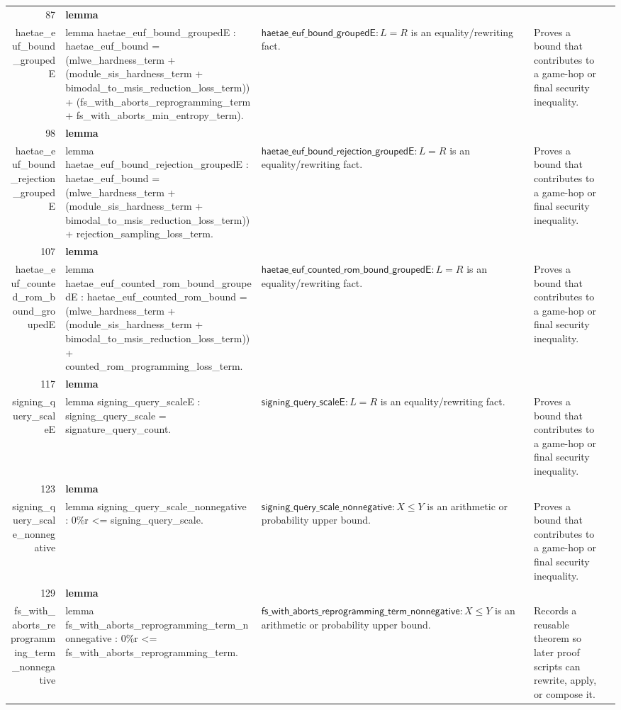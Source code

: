 \documentclass[10pt]{article}
\newcommand{\ec}[1]{\begingroup\ttfamily\scriptsize #1\endgroup}
\begin{document}
\begin{longtable}{r L{0.17\textwidth} L{0.26\textwidth} L{0.27\textwidth} L{0.20\textwidth}}
87 & \textbf{lemma}\\\ec{haetae\_euf\_bound\_groupedE} & \ec{lemma haetae\_euf\_bound\_groupedE : haetae\_euf\_bound = (mlwe\_hardness\_term + (module\_sis\_hardness\_term + bimodal\_to\_msis\_reduction\_loss\_term)) + (fs\_with\_aborts\_reprogramming\_term + fs\_with\_aborts\_min\_entropy\_term).} & \(\mathsf{haetae\_euf\_bound\_groupedE} : L = R\) is an equality/rewriting fact. & Proves a bound that contributes to a game-hop or final security inequality. \\
98 & \textbf{lemma}\\\ec{haetae\_euf\_bound\_rejection\_groupedE} & \ec{lemma haetae\_euf\_bound\_rejection\_groupedE : haetae\_euf\_bound = (mlwe\_hardness\_term + (module\_sis\_hardness\_term + bimodal\_to\_msis\_reduction\_loss\_term)) + rejection\_sampling\_loss\_term.} & \(\mathsf{haetae\_euf\_bound\_rejection\_groupedE} : L = R\) is an equality/rewriting fact. & Proves a bound that contributes to a game-hop or final security inequality. \\
107 & \textbf{lemma}\\\ec{haetae\_euf\_counted\_rom\_bound\_groupedE} & \ec{lemma haetae\_euf\_counted\_rom\_bound\_groupedE : haetae\_euf\_counted\_rom\_bound = (mlwe\_hardness\_term + (module\_sis\_hardness\_term + bimodal\_to\_msis\_reduction\_loss\_term)) + counted\_rom\_programming\_loss\_term.} & \(\mathsf{haetae\_euf\_counted\_rom\_bound\_groupedE} : L = R\) is an equality/rewriting fact. & Proves a bound that contributes to a game-hop or final security inequality. \\
117 & \textbf{lemma}\\\ec{signing\_query\_scaleE} & \ec{lemma signing\_query\_scaleE : signing\_query\_scale = signature\_query\_count.} & \(\mathsf{signing\_query\_scaleE} : L = R\) is an equality/rewriting fact. & Proves a bound that contributes to a game-hop or final security inequality. \\
123 & \textbf{lemma}\\\ec{signing\_query\_scale\_nonnegative} & \ec{lemma signing\_query\_scale\_nonnegative : 0\%r <= signing\_query\_scale.} & \(\mathsf{signing\_query\_scale\_nonnegative} : X \le Y\) is an arithmetic or probability upper bound. & Proves a bound that contributes to a game-hop or final security inequality. \\
129 & \textbf{lemma}\\\ec{fs\_with\_aborts\_reprogramming\_term\_nonnegative} & \ec{lemma fs\_with\_aborts\_reprogramming\_term\_nonnegative : 0\%r <= fs\_with\_aborts\_reprogramming\_term.} & \(\mathsf{fs\_with\_aborts\_reprogramming\_term\_nonnegative} : X \le Y\) is an arithmetic or probability upper bound. & Records a reusable theorem so later proof scripts can rewrite, apply, or compose it. \\

\end{longtable}
\end{document}

